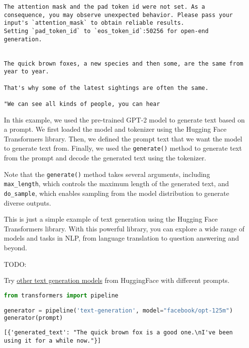 \begin{lstlisting}
The attention mask and the pad token id were not set. As a consequence, you may observe unexpected behavior. Please pass your input's `attention_mask` to obtain reliable results.
Setting `pad_token_id` to `eos_token_id`:50256 for open-end generation.


The quick brown foxes, a new species and then some, are the same from year to year.

That's why some of the latest sightings are often the same.

"We can see all kinds of people, you can hear
\end{lstlisting}

In this example, we used the pre-trained GPT-2 model to generate text
based on a prompt. We first loaded the model and tokenizer using the
Hugging Face Transformers library. Then, we defined the prompt text that
we want the model to generate text from. Finally, we used the
\lstinline{generate()} method to generate text from the
prompt and decode the generated text using the tokenizer. \newline

Note that the \lstinline{generate()} method takes several
arguments, including \lstinline{max_length}, which
controls the maximum length of the generated text, and
\lstinline{do_sample}, which enables sampling from the
model distribution to generate diverse outputs. \newline

This is just a simple example of text generation using the Hugging Face
Transformers library. With this powerful library, you can explore a wide
range of models and tasks in NLP, from language translation to question
answering and beyond. \newline

TODO:

Try
\href{https://huggingface.co/models?pipeline_tag=text-generation&sort=downloads}{other
text generation models} from HuggingFace with different prompts.

\begin{lstlisting}[language=Python]
from transformers import pipeline

generator = pipeline('text-generation', model="facebook/opt-125m")
generator(prompt)
\end{lstlisting}

\begin{lstlisting}
[{'generated_text': "The quick brown fox is a good one.\nI've been using it for a while now."}]
\end{lstlisting}
